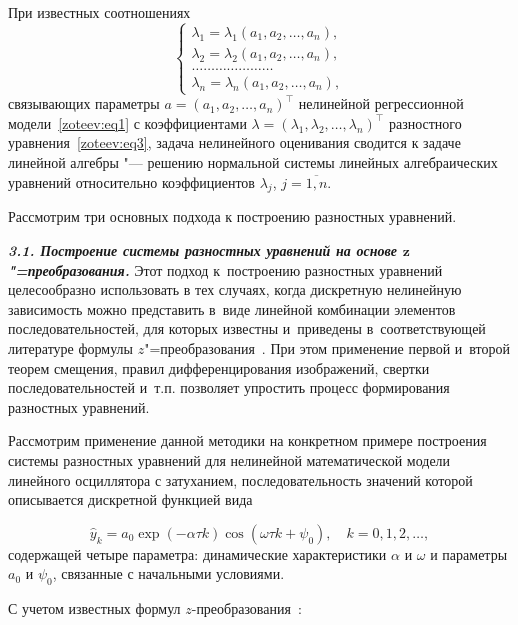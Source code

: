 При известных соотношениях
\begin{equation}
\left\{
\begin{array}{l}
{\lambda_1=\lambda_1(a_1,a_2,\dots,a_n),} \\
{\lambda_2=\lambda_2(a_1,a_2,\dots,a_n),} \\
{\dots\dots\dots\dots\dots\dots\dots}\\
{\lambda_n=\lambda_n(a_1,a_2,\dots,a_n),} 
\label{zoteev:eq4}
\end{array}
\right.
\end{equation}
связывающих параметры $a=(a_1,a_2,\dots,a_n)^{\top}$ нелинейной регрессионной модели~\eqref{zoteev:eq1} с коэффициентами $\lambda=(\lambda_1,\lambda_2,\dots,\lambda_n)^{\top}$ разностного уравнения~\eqref{zoteev:eq3},
задача нелинейного оценивания сводится к задаче линейной алгебры "--- решению нормальной системы линейных алгебраических уравнений относительно коэффициентов $\lambda_j$, $j=\overline{1,n}$.

Рассмотрим три основных подхода к построению разностных уравнений.

\smallskip

{\bf \itshape 3.1. Построение системы разностных уравнений на основе $\boldsymbol z$"=преобразования.} 
Этот подход к~построению разностных уравнений целесообразно использовать в тех случаях, когда дискретную нелинейную зависимость можно представить в~виде линейной комбинации элементов последовательностей, для которых известны и~приведены в~соответствующей литературе формулы $z$"=преобразования~\cite{zot:12}. 
При этом применение первой и~второй теорем смещения, правил дифференцирования изображений, свертки последовательностей и~т.п. позволяет упростить процесс формирования разностных уравнений.

Рассмотрим применение данной методики на конкретном примере построения системы разностных уравнений для нелинейной математической модели линейного осциллятора с затуханием, последовательность значений которой описывается дискретной функцией вида~\cite{zot:11}

\begin{equation}
\hat{y}_k=a_0 \exp(-\alpha \tau k)\cos(\omega \tau k+\psi_0), \quad k=0,1,2,\dots,
\label{zoteev:eq5}
\end{equation}	
содержащей четыре параметра: динамические характеристики $\alpha$ и $\omega$ и параметры $a_0$ и $\psi_0$, связанные с начальными условиями.

С учетом известных формул $z$-преобразования~\cite{zot:9}:

